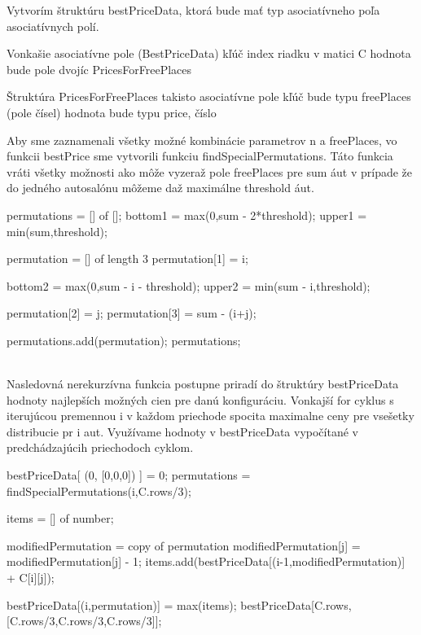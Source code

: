 \documentclass[paper=a4, fontsize=11pt]{scrartcl} %
\numberwithin{equation}{section} %
\numberwithin{figure}{section} %
\numberwithin{table}{section} %
\begin{document}
Vytvorím štruktúru bestPriceData, ktorá  bude mať typ asociatívneho poľa asociatívnych polí.


Vonkašie asociatívne pole (BestPriceData)
kľúč index riadku v matici C
hodnota bude pole dvojíc PricesForFreePlaces

Štruktúra PricesForFreePlaces takisto asociatívne pole
kľúč bude typu freePlaces (pole čísel)
hodnota bude typu price, číslo



Aby sme zaznamenali všetky možné kombinácie parametrov n a freePlaces, vo funkcii bestPrice sme vytvorili funkciu findSpecialPermutations. Táto funkcia vráti všetky možnosti ako môže vyzeraž pole freePlaces pre sum áut v prípade že do jedného autosalónu môžeme daž maximálne threshold áut.

\begin{algorithmic}
		\State \Return [0,0,0]
	\EndIf
	\State permutations = [] of [];
	\State bottom1 = max(0,sum - 2*threshold);
	\State upper1 = min(sum,threshold);
	
		\State permutation = [] of length 3
		\State permutation[1] = i;
		
		\State bottom2 = max(0,sum - i - threshold);
		\State upper2 = min(sum - i,threshold);
		
			\State permutation[2] = j;
			\State permutation[3] = sum - (i+j);
		\EndFor
		
		
		permutations.add(permutation);
	\EndFor
	\State \Return permutations;
\EndFunction
\end{algorithmic}

\ \\

Nasledovná nerekurzívna funkcia postupne priradí do štruktúry bestPriceData hodnoty najlepších možných cien pre danú konfiguráciu.
Vonkajší for cyklus s iterujúcou premennou i v každom priechode spocita maximalne ceny pre vsešetky distribucie pr i aut.
Využívame hodnoty v bestPriceData vypočítané v predchádzajúcih priechodoch cyklom.


\begin{algorithmic}[1]
    \State bestPriceData[ (0, [0,0,0]) ] = 0;
        \State permutations = findSpecialPermutations(i,C.rows/3);
	
		
            
            \State items = [] of number;
            
	    	
                \State modifiedPermutation = copy of permutation
		    \State modifiedPermutation[j] = modifiedPermutation[j] - 1;
		    \State items.add(bestPriceData[(i-1,modifiedPermutation)] + C[i][j]);
                 \EndIf
            \EndFor			
		
            \State bestPriceData[(i,permutation)] = max(items);		
        \EndFor
    \EndFor
    \State \Return bestPriceData[C.rows,[C.rows/3,C.rows/3,C.rows/3]];
\EndFunction
\end{algorithmic}
\end{document}
